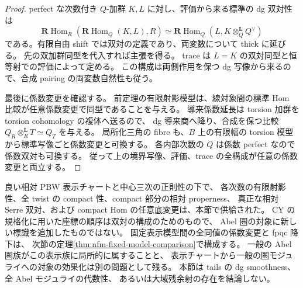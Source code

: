 \begin{proof}
perfect な次数付き $Q$-加群 $K,L$ に対し、評価から来る標準の dg 双対性は
\[
 \mathbf R\operatorname{Hom}_R(\mathbf R\operatorname{Hom}_Q(K,L),R)
 \simeq\mathbf R\operatorname{Hom}_Q
       (L,K\otimes_Q^{\mathbf L}Q^\vee)
\]
である。有限自由 shift では双対の定義であり、両変数について thick に延びる。
先の双加群同型を代入すれば主張を得る。
trace は $L=K$ の双対同型と恒等射での評価によって定める。
この構成は両側作用を保つ dg 写像から来るので、合成 pairing の両変数自然性も従う。

最後に係数変更を確認する。
前定理の有限射影模型は、線対象間の標準 Hom 比較が任意係数変更で同型であることを与える。
導来係数延長は torsion 加群を torsion cohomology の複体へ送るので、
dg 導来商へ降り、合成を保つ比較
$Q_R\otimes_R^{\mathbf L}T\simeq Q_T$ を与える。
局所化三角の fibre も、$B$ 上の有限幅の torsion 模型から標準写像ごと係数変更と可換する。
各内部次数の $Q$ は係数 perfect なので係数双対も可換する。
従って上の境界写像、評価、trace の全構成が任意の係数変更と両立する。
\end{proof}

\begin{remark}[供給された入力と残るモジュライ上の問題]
良い相対 PBW 表示チャートと中心三次の正則性の下で、
各次数の有限射影性、全 twist の compact 性、compact 部分の相対 properness、
真正な相対 Serre 双対、および compact Hom の任意底変更は、本節で供給された。
CY の規格化に用いた座標の順序は双対の構成のためのもので、
Abel 圏の対象に新しい標識を追加したものではない。
固定表示模型間の全同値の係数変更と fpqc 降下は、
次節の定理\ref{thm:nfm-fixed-model-comparison}で構成する。
一般の Abel 圏族がこの表示族に局所的に属することと、
表示チャートから一般の圏モジュライへの対象の効果化は別の問題として残る。
本節は tails の dg smoothness、全 Abel モジュライの代数性、
あるいは大域残余射の存在を結論しない。
\end{remark}
